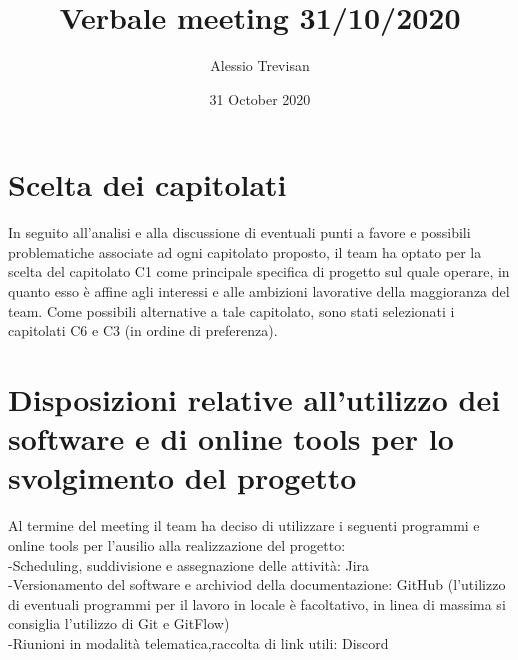 \documentclass{article}
\title{Verbale meeting 31/10/2020}
\author{Alessio Trevisan }
\date{31 October 2020}
\begin{document}
\maketitle

\section{Scelta dei capitolati}
In seguito all'analisi e alla discussione di eventuali punti a favore e possibili problematiche associate ad ogni capitolato proposto, il team ha optato per la scelta del capitolato C1 come principale specifica di progetto sul quale operare, in quanto esso è affine agli interessi e alle ambizioni lavorative della maggioranza del team. Come possibili alternative a tale capitolato, sono stati selezionati i capitolati C6 e C3 (in ordine di preferenza).
\section{Disposizioni relative all'utilizzo dei software e di online tools per lo svolgimento del progetto }
Al termine del meeting il team ha deciso di utilizzare i seguenti programmi e online tools per l'ausilio alla realizzazione del progetto:\\
-Scheduling, suddivisione e assegnazione delle attività: Jira\\
-Versionamento del software e archiviod della documentazione: GitHub (l'utilizzo di eventuali programmi per il lavoro in locale è facoltativo, in linea di massima si consiglia l'utilizzo di Git e GitFlow)\\
-Riunioni in modalità telematica,raccolta di link utili: Discord
\end{document}
